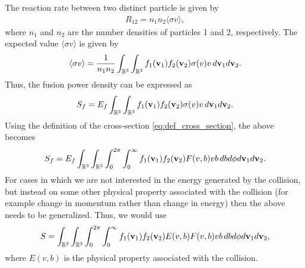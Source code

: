 \documentclass[a4paper,11pt]{report}
\begin{document}
\begin{itemize}
The reaction rate between two distinct particle is given by
\begin{align}
    R_{12} = n_1 n_2 \langle \sigma v \rangle,
\end{align}
where $n_1$ and $n_2$ are the number densities of particles 1 and 2, respectively. The expected value $\langle \sigma v \rangle$ is given by
\begin{equation}
    \langle \sigma v \rangle = \frac{1}{n_1 n_2} \int_{\mathbb{R}^3} \int_{\mathbb{R}^3} f_1(\mathbf{v}_1) f_2(\mathbf{v}_2) \sigma(v) v \, d\mathbf{v}_1 d\mathbf{v}_2.
\end{equation}
Thus, the fusion power density can be expressed as
\begin{equation}
    S_f = E_f \int_{\mathbb{R}^3} \int_{\mathbb{R}^3} f_1(\mathbf{v}_1) f_2(\mathbf{v}_2) \sigma(v) v \, d\mathbf{v}_1 d\mathbf{v}_2.
\end{equation}
Using the definition of the cross-section \cref{eq:def_cross_section}, the above becomes
\begin{equation}
    S_f = E_f \int_{\mathbb{R}^3} \int_{\mathbb{R}^3} \int_0^{2\pi} \int_0^\infty f_1(\mathbf{v}_1) f_2(\mathbf{v}_2) F(v,b) v b \, db d\phi d\mathbf{v}_1 d\mathbf{v}_2.
\end{equation}
For cases in which we are not interested in the energy generated by the collision, but instead on some other physical property associated with the collision (for example change in momentum rather than change in energy) then the above needs to be generalized. Thus, we would use
\begin{equation}
    S = \int_{\mathbb{R}^3} \int_{\mathbb{R}^3} \int_0^{2\pi} \int_0^\infty f_1(\mathbf{v}_1) f_2(\mathbf{v}_2) E(v,b) F(v,b) v b \, db d\phi d\mathbf{v}_1 d\mathbf{v}_2,
\end{equation}
where $E(v,b)$ is the physical property associated with the collision.

\end{itemize}
\end{document}
